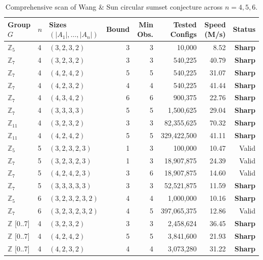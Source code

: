 \documentclass[11pt,a4paper]{article}
\theoremstyle{definition}
\theoremstyle{remark}
\begin{document}
\begin{table}[htbp]
\centering
\small
\caption{Comprehensive scan of Wang \& Sun circular sumset conjecture across $n = 4, 5, 6$.}
\label{tab:wang_sun}
\begin{tabular}{lllrrrrr}
\toprule
Group $G$ & $n$ & Sizes $(|A_1|, \dots, |A_n|)$ & Bound & Min Obs. & Tested Configs & Speed (M/s) & Status \\
\midrule
$\mathbb{Z}_5$  & 4 & $(3, 2, 3, 2)$ & 3  & 3  & 10,000        & 8.52  & \textbf{Sharp} \\
$\mathbb{Z}_7$  & 4 & $(3, 2, 3, 2)$ & 3  & 3  & 540,225       & 40.79 & \textbf{Sharp} \\
$\mathbb{Z}_7$  & 4 & $(4, 2, 4, 2)$ & 5  & 5  & 540,225       & 31.07 & \textbf{Sharp} \\
$\mathbb{Z}_7$  & 4 & $(4, 2, 3, 2)$ & 4  & 4  & 540,225       & 41.44 & \textbf{Sharp} \\
$\mathbb{Z}_7$  & 4 & $(4, 3, 4, 2)$ & 6  & 6  & 900,375       & 22.76 & \textbf{Sharp} \\
$\mathbb{Z}_7$  & 4 & $(3, 3, 3, 3)$ & 5  & 5  & 1,500,625     & 29.04 & \textbf{Sharp} \\
$\mathbb{Z}_{11}$ & 4 & $(3, 2, 3, 2)$ & 3  & 3  & 82,355,625    & 70.32 & \textbf{Sharp} \\
$\mathbb{Z}_{11}$ & 4 & $(4, 2, 4, 2)$ & 5  & 5  & 329,422,500   & 41.11 & \textbf{Sharp} \\
$\mathbb{Z}_5$  & 5 & $(3, 2, 3, 2, 3)$ & 1  & 3  & 100,000       & 10.47 & Valid \\
$\mathbb{Z}_7$  & 5 & $(3, 2, 3, 2, 3)$ & 1  & 3  & 18,907,875    & 24.39 & Valid \\
$\mathbb{Z}_7$  & 5 & $(4, 2, 4, 2, 3)$ & 3  & 6  & 18,907,875    & 14.60 & Valid \\
$\mathbb{Z}_7$  & 5 & $(3, 3, 3, 3, 3)$ & 3  & 3  & 52,521,875    & 11.59 & \textbf{Sharp} \\
$\mathbb{Z}_5$  & 6 & $(3, 2, 3, 2, 3, 2)$ & 4  & 4  & 1,000,000     & 10.16 & \textbf{Sharp} \\
$\mathbb{Z}_7$  & 6 & $(3, 2, 3, 2, 3, 2)$ & 4  & 5  & 397,065,375   & 12.86 & Valid \\
\midrule
$\mathbb{Z}$ [0..7] & 4 & $(3, 2, 3, 2)$ & 3  & 3  & 2,458,624     & 36.45 & \textbf{Sharp} \\
$\mathbb{Z}$ [0..7] & 4 & $(4, 2, 4, 2)$ & 5  & 5  & 3,841,600     & 21.93 & \textbf{Sharp} \\
$\mathbb{Z}$ [0..7] & 4 & $(4, 2, 3, 2)$ & 4  & 4  & 3,073,280     & 31.22 & \textbf{Sharp} \\

\end{tabular}
\end{table}
\end{document}
